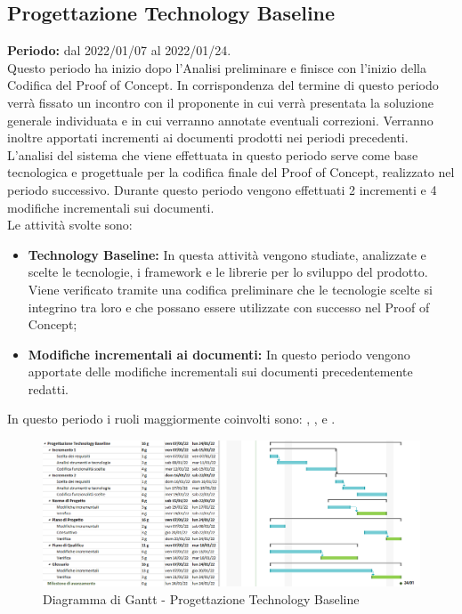\subsection{Progettazione Technology Baseline} \label{subsection:pianificazione_TB}
\textbf{Periodo:} dal 2022/01/07 al 2022/01/24.
\bigskip
\\Questo periodo ha inizio dopo l'Analisi preliminare e finisce con l'inizio della Codifica del Proof of Concept\glo.
In corrispondenza del termine di questo periodo verrà fissato un incontro con il proponente in cui verrà presentata la soluzione generale individuata e in cui verranno annotate eventuali correzioni.
Verranno inoltre apportati incrementi ai documenti prodotti nei periodi precedenti.
L'analisi del sistema che viene effettuata in questo periodo serve come base tecnologica e progettuale per la codifica finale del Proof of Concept\glo, realizzato nel periodo successivo.
Durante questo periodo vengono effettuati 2 incrementi e 4 modifiche incrementali sui documenti.
\\Le attività svolte sono:
\begin{itemize}
  \item \textbf{Technology Baseline:} In questa attività vengono studiate, analizzate e scelte le tecnologie, i framework e le librerie per lo sviluppo del prodotto.
  Viene verificato tramite una codifica preliminare che le tecnologie scelte si integrino tra loro e che possano essere utilizzate con successo nel Proof of Concept\glo;
  \item \textbf{Modifiche incrementali ai documenti:} In questo periodo vengono apportate delle modifiche incrementali sui documenti precedentemente redatti.
\end{itemize}
In questo periodo i ruoli maggiormente coinvolti sono: \roleAdministratorLow{}, \roleAnalystLow{}, \roleDesignerLow{} e \roleVerifierLow{}.
\bigskip
\begin{figure}[H]
  \centering
   \includegraphics[scale=0.56]{immagini/technology_baseline.png}
   \caption{Diagramma di Gantt - Progettazione Technology Baseline}
 \end{figure}
 \pagebreak

